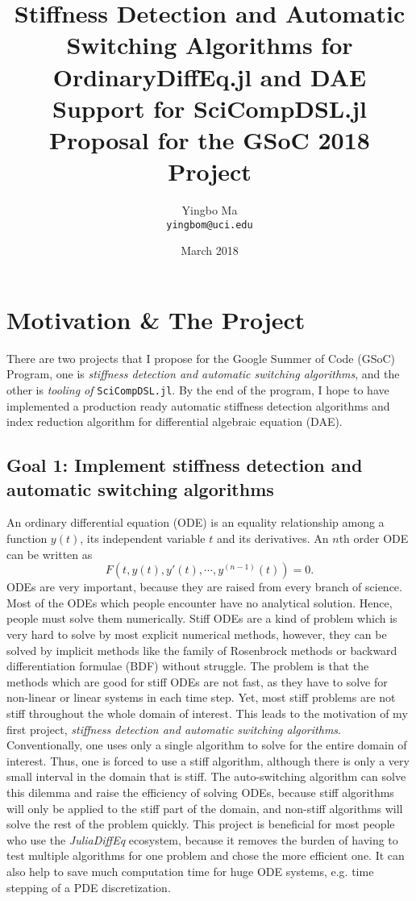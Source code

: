 \documentclass[12pt]{article}
\author{Yingbo Ma\\ \tt{yingbom@uci.edu}}
\date{March 2018}
\title{Stiffness Detection and Automatic Switching Algorithms for
OrdinaryDiffEq.jl and DAE Support for SciCompDSL.jl \\
\large{Proposal for the GSoC 2018 Project}}
\begin{document}
\maketitle
\tableofcontents

\section{Motivation \& The Project}
There are two projects that I propose for the Google Summer of Code (GSoC)
Program, one is \textit{stiffness detection and automatic switching
algorithms}, and the other is \textit{tooling of} \texttt{SciCompDSL.jl}. By
the end of the program, I hope to have implemented a production ready automatic
stiffness detection algorithms and index reduction algorithm for differential
algebraic equation (DAE).

\subsection{Goal 1: Implement stiffness detection and automatic switching
algorithms}
An ordinary differential equation (ODE) is an equality relationship among a
function $y(t)$, its independent variable $t$ and its derivatives. An $n$th
order ODE can be written as
\begin{equation}
  F(t, y(t), y'(t), \cdots, y^{(n-1)}(t)) = 0.
\end{equation}
ODEs are very important, because they are raised from every branch of science.
Most of the ODEs which people encounter have no analytical solution. Hence,
people must solve them numerically. Stiff ODEs are a kind of problem which is
very hard to solve by most explicit numerical methods, however, they can be
solved by implicit methods like the family of Rosenbrock methods or backward
differentiation formulae (BDF) without struggle. The problem is that the
methods which are good for stiff ODEs are not fast, as they have to solve for
non-linear or linear systems in each time step. Yet, most stiff problems are
not stiff throughout the whole domain of interest. This leads to the motivation
of my first project, \textit{stiffness detection and automatic switching
algorithms}. Conventionally, one uses only a single algorithm to solve for the
entire domain of interest. Thus, one is forced to use a stiff algorithm,
although there is only a very small interval in the domain that is stiff. The
auto-switching algorithm can solve this dilemma and raise the efficiency of
solving ODEs, because stiff algorithms will only be applied to the stiff part
of the domain, and non-stiff algorithms will solve the rest of the problem
quickly. This project is beneficial for most people who use the
\textit{JuliaDiffEq} ecosystem, because it removes the burden of having to test
multiple algorithms for one problem and chose the more efficient one. It can
also help to save much computation time for huge ODE systems, e.g. time
stepping of a PDE discretization.
\end{document}
